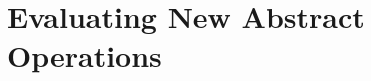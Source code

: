 
\cleardoublepage
\chapter{Evaluating New Abstract Operations}
\label{cha:evaluating_new_abstact_operations}


%


%

